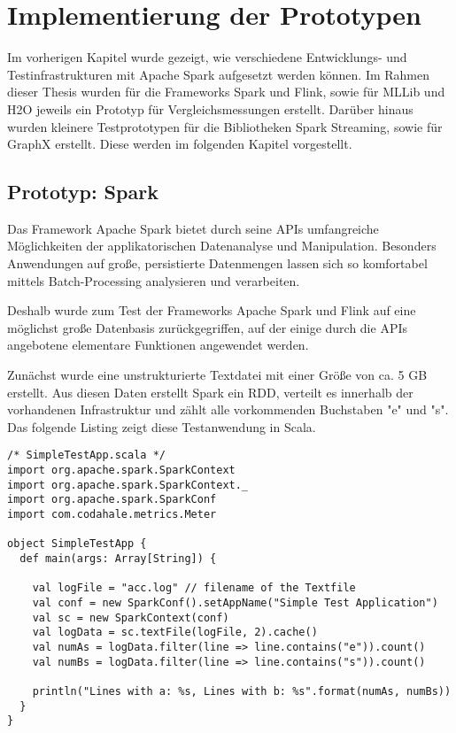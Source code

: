 \chapter{Implementierung der Prototypen }
\label{chapter:implementierung}



Im vorherigen Kapitel wurde gezeigt, wie verschiedene Entwicklungs- und Testinfrastrukturen mit Apache Spark aufgesetzt werden können. Im Rahmen dieser Thesis wurden für die Frameworks Spark und Flink, sowie für MLLib und H2O jeweils ein Prototyp für Vergleichsmessungen erstellt. Darüber hinaus wurden kleinere Testprototypen für die Bibliotheken Spark Streaming, sowie für GraphX erstellt. Diese werden im folgenden Kapitel vorgestellt.  

\section{Prototyp: Spark}
\label{section:prototyp spark}

Das Framework Apache Spark bietet durch seine APIs umfangreiche Möglichkeiten der applikatorischen Datenanalyse und Manipulation. Besonders Anwendungen auf große, persistierte Datenmengen lassen sich so komfortabel mittels Batch-Processing analysieren und verarbeiten. 

Deshalb wurde zum Test der Frameworks Apache Spark und Flink auf eine möglichst große Datenbasis zurückgegriffen, auf der einige durch die APIs angebotene elementare Funktionen angewendet werden.  

Zunächst wurde eine unstrukturierte Textdatei mit einer Größe von ca. 5 GB erstellt. Aus diesen Daten erstellt Spark ein RDD, verteilt es innerhalb der vorhandenen Infrastruktur und zählt alle vorkommenden Buchstaben "e" und "s". 
Das folgende Listing zeigt diese Testanwendung in Scala.

\newpage

\begin{lstlisting}[label=vwikilogs,caption=SimpleTestApp.scala - zählt Buchstabenvorkommen in Textdateien.]
 /* SimpleTestApp.scala */
import org.apache.spark.SparkContext
import org.apache.spark.SparkContext._
import org.apache.spark.SparkConf
import com.codahale.metrics.Meter

object SimpleTestApp {
  def main(args: Array[String]) {

    val logFile = "acc.log" // filename of the Textfile
    val conf = new SparkConf().setAppName("Simple Test Application")
    val sc = new SparkContext(conf)
    val logData = sc.textFile(logFile, 2).cache()
    val numAs = logData.filter(line => line.contains("e")).count()
    val numBs = logData.filter(line => line.contains("s")).count()
    
    println("Lines with a: %s, Lines with b: %s".format(numAs, numBs))
  }
}
\end{lstlisting}

